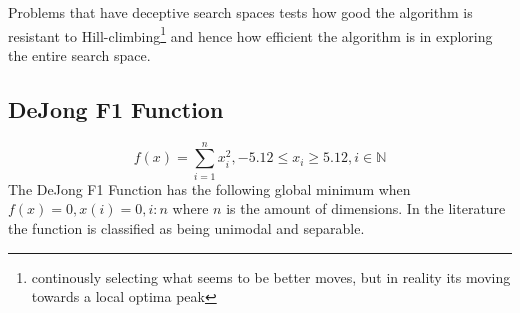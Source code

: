 Problems that have deceptive search spaces tests how good the algorithm is resistant to Hill-climbing\footnote{continously selecting what seems to be better moves, but in reality its moving towards a local optima peak} and hence how efficient the algorithm is in exploring the entire search space\cite{evalevoalgo}.
\subsection{DeJong F1 Function}
\begin{equation}
\label{eq:DeJongF1}
	f(x) = \sum_{i=1}^n x^2_i, -5.12 \leq x_i \geq 5.12, i \in \mathbb{N}
\end{equation}
The DeJong F1 Function has the following global minimum when $f(x) = 0, x(i) = 0, i:n$ where $n$ is the amount of dimensions\cite{numericalABC,ABCCompareStudy,ARPSO,PerfABC,ContinACSTS,TestFunctions}. In the literature the function is classified as being unimodal and separable\cite{ABCCompareStudy,TestFunctions}. 
